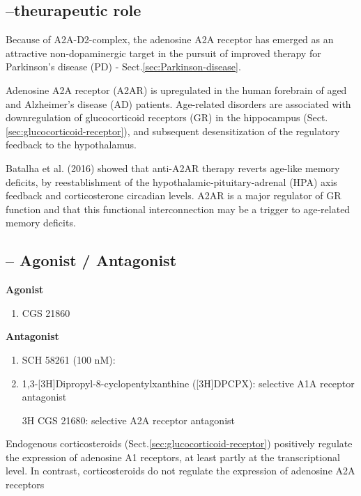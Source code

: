 \subsection{--theurapeutic role}

Because of A2A-D2-complex, the adenosine A2A receptor has emerged as an
attractive non-dopaminergic target in the pursuit of improved therapy for
Parkinson's disease (PD) - Sect.\ref{sec:Parkinson-disease}.

Adenosine A2A receptor (A2AR) is upregulated in the human forebrain of aged and
Alzheimer's disease (AD) patients.
Age-related disorders are associated with downregulation of glucocorticoid
receptors (GR) in the hippocampus (Sect.\ref{sec:glucocorticoid-receptor}), and
subsequent desensitization of the regulatory feedback to the hypothalamus.

Batalha et al. (2016) showed that anti-A2AR therapy reverts age-like memory
deficits, by reestablishment of the hypothalamic-pituitary-adrenal (HPA) axis
feedback and corticosterone circadian levels. A2AR is a major regulator of GR
function and that this functional interconnection may be a trigger to
age-related memory deficits.



\subsection{-- Agonist / Antagonist}

{\bf Agonist}
\begin{enumerate}
  \item CGS 21860
\end{enumerate}

{\bf Antagonist}
\begin{enumerate}
  \item SCH 58261 (100 nM): 
  
  \item 1,3-[3H]Dipropyl-8-cyclopentylxanthine ([3H]DPCPX): selective A1A
  receptor antagonist
  
  \item [3H]CGS 21680: selective A2A receptor antagonist
\end{enumerate}

Endogenous corticosteroids (Sect.\ref{sec:glucocorticoid-receptor}) positively
regulate the expression of adenosine A1 receptors, at least partly at the transcriptional
level. In contrast, corticosteroids do not regulate the expression
of adenosine A2A receptors 


